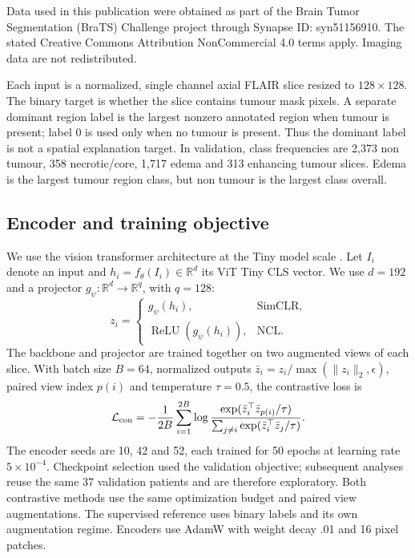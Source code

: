 \documentclass[letterpaper]{article}
\begin{document}
Data used in this publication were obtained as part of the Brain Tumor Segmentation (BraTS) Challenge project through Synapse ID: syn51156910. The stated Creative Commons Attribution NonCommercial 4.0 terms apply. Imaging data are not redistributed.

Each input is a normalized, single channel axial FLAIR slice resized to $128\times128$. The binary target is whether the slice contains tumour mask pixels. A separate dominant region label is the largest nonzero annotated region when tumour is present; label 0 is used only when no tumour is present. Thus the dominant label is not a spatial explanation target. In validation, class frequencies are 2,373 non tumour, 358 necrotic/core, 1,717 edema and 313 enhancing tumour slices. Edema is the largest tumour region class, but non tumour is the largest class overall.

\subsection{Encoder and training objective}
We use the vision transformer architecture \cite{dosovitskiy2021vit} at the Tiny model scale \cite{touvron2021deit}. Let $I_i$ denote an input and $h_i=f_\theta(I_i)\in\mathbb R^d$ its ViT Tiny CLS vector. We use $d=192$ and a projector $g_\psi:\mathbb R^d\to\mathbb R^q$, with $q=128$:
\begin{equation}
z_i=\begin{cases}g_\psi(h_i),&\text{SimCLR},\\
\operatorname{ReLU}(g_\psi(h_i)),&\text{NCL}.
\end{cases}\label{eq:projector}
\end{equation}
The backbone and projector are trained together on two augmented views of each slice. With batch size $B=64$, normalized outputs $\bar z_i=z_i/\max(\|z_i\|_2,\epsilon)$, paired view index $p(i)$ and temperature $\tau=0.5$, the contrastive loss is
\begin{equation}
\mathcal L_{\rm con}=-\frac{1}{2B}\sum_{i=1}^{2B}
\log\frac{\exp(\bar z_i^\top\bar z_{p(i)}/\tau)}
{\sum_{j\ne i}\exp(\bar z_i^\top\bar z_j/\tau)}.
\label{eq:contrastive}
\end{equation}
The encoder seeds are 10, 42 and 52, each trained for 50 epochs at learning rate $5\times10^{-4}$. Checkpoint selection used the validation objective; subsequent analyses reuse the same 37 validation patients and are therefore exploratory. Both contrastive methods use the same optimization budget and paired view augmentations. The supervised reference uses binary labels and its own augmentation regime. Encoders use AdamW with weight decay .01 and 16 pixel patches.
\end{document}
